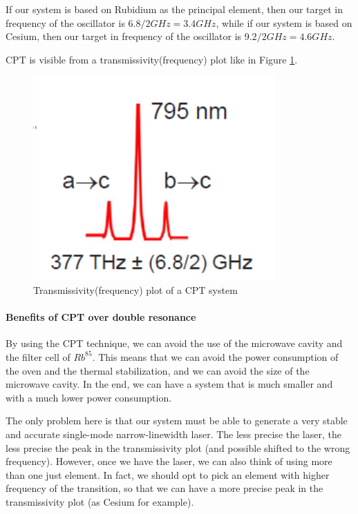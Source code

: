If our system is based on Rubidium as the principal element, then our target in frequency of the oscillator is $6.8/2 GHz = 3.4 GHz$, while if our system is based on Cesium, then our target in frequency of the oscillator is $9.2/2 GHz = 4.6 GHz$.

CPT is visible from a transmissivity(frequency) plot like in Figure \ref{fig:CPT-transmissivity-frequency}.

\begin{figure}[H]
    \centering
    \includegraphics[width=\linewidth]{img/02.3-CPT-transmissivity-frequency.png}
    \caption{Transmissivity(frequency) plot of a CPT system}
    \label{fig:CPT-transmissivity-frequency}
\end{figure}

\paragraph{Benefits of CPT over double resonance}

By using the CPT technique, we can avoid the use of the microwave cavity and the filter cell of $Rb^{85}$.
This means that we can avoid the power consumption of the oven and the thermal stabilization, and we can avoid the size of the microwave cavity.
In the end, we can have a system that is much smaller and with a much lower power consumption.

The only problem here is that our system must be able to generate a very stable and accurate single-mode narrow-linewidth laser.
The less precise the laser, the less precise the peak in the transmissivity plot (and possible shifted to the wrong frequency).
However, once we have the laser, we can also think of using more than one just element.
In fact, we should opt to pick an element with higher frequency of the transition, so that we can have a more precise peak in the transmissivity plot (as Cesium for example).

